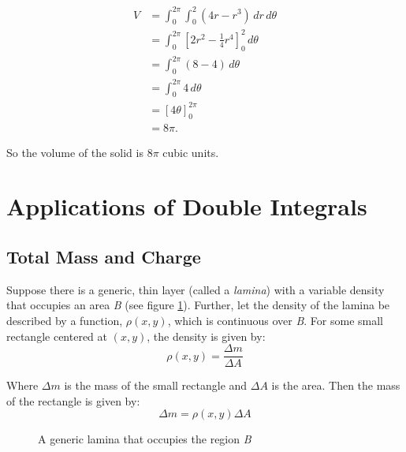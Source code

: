 \begin{Answer}[ref=polarmulti]
\begin{align*}
V & = \int_{0}^{2\pi} \int_{0}^{2} (4r - r^3) \, dr \, d\theta \\
& = \int_{0}^{2\pi} \left[ 2r^2 - \frac{1}{4}r^4 \right]_{0}^{2} \, d\theta \\
& = \int_{0}^{2\pi} (8 - 4) \, d\theta \\
& = \int_{0}^{2\pi} 4 \, d\theta \\
& = \left[ 4\theta \right]_{0}^{2\pi} \\
& = 8\pi.
\end{align*}

So the volume of the solid is $8\pi$ cubic units.

\end{Answer}

\section{Applications of Double Integrals}

\subsection{Total Mass and Charge}
Suppose there is a generic, thin layer (called a \textit{lamina}) with a 
variable density that occupies an area \textit{B} (see figure \ref{fig:lamina}).
Further, let the density of the lamina be described by a function, $\rho 
(x, y)$, which is continuous over \textit{B}. For some small rectangle centered
at $(x, y)$, the density is given by:
$$\rho (x, y) = \frac{\Delta m}{\Delta A}$$

Where $\Delta m$ is the mass of the small rectangle and $\Delta A$ is the area.
Then the mass of the rectangle is given by:
$$\Delta m = \rho (x, y) \Delta A$$

\begin{figure}[htbp]
\centering
    \caption{A generic lamina that occupies the region \textit{B}}
    \label{fig:lamina}
\end{figure}

